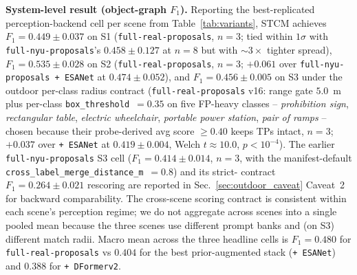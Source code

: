\noindent\textbf{System-level result (object-graph $F_1$).}
Reporting the best-replicated perception-backend cell per scene
from Table~\ref{tab:variants}, STCM achieves
$F_1{=}0.449 \pm 0.037$ on S1 (\texttt{full-real-proposals},
$n{=}3$; tied within $1\sigma$ with \texttt{full-nyu-proposals}'s
$0.458 \pm 0.127$ at $n{=}8$ but with $\sim 3\times$ tighter
spread), $F_1{=}0.535 \pm 0.028$ on S2
(\texttt{full-real-proposals}, $n{=}3$; $+0.061$ over
\texttt{full-nyu-proposals + ESANet} at $0.474 \pm 0.052$), and
$F_1{=}0.456 \pm 0.005$ on S3 under the outdoor per-class radius
contract (\texttt{full-real-proposals} v16: range gate $5.0$~m
plus per-class \texttt{box\_threshold}~$=0.35$ on five FP-heavy
classes -- \textit{prohibition sign}, \textit{rectangular table},
\textit{electric wheelchair}, \textit{portable power station},
\textit{pair of ramps} -- chosen because their probe-derived avg
score $\geq 0.40$ keeps TPs intact, $n{=}3$; $+0.037$ over
\texttt{+ ESANet} at $0.419 \pm 0.004$, Welch $t{\approx}10.0$,
$p{<}10^{-4}$). The earlier
\texttt{full-nyu-proposals} S3 cell ($F_1{=}0.414 \pm 0.014$,
$n{=}3$, with the manifest-default
\texttt{cross\_label\_merge\_distance\_m}~$=0.8$) and its strict-
contract $F_1{=}0.264 \pm 0.021$ rescoring are reported in
Sec.~\ref{sec:outdoor_caveat} Caveat~2 for backward comparability.
The cross-scene scoring contract is consistent within each scene's
perception regime; we do not aggregate across scenes into a single
pooled mean because the three scenes use different prompt banks
and (on S3) different match radii. Macro mean across the three
headline cells is $F_1{=}0.480$ for \texttt{full-real-proposals}
vs $0.404$ for the best prior-augmented stack
(\texttt{+ ESANet}) and $0.388$ for \texttt{+ DFormerv2}.

